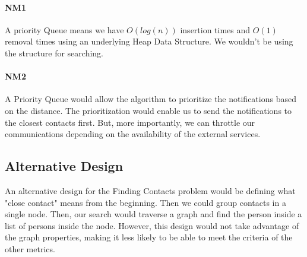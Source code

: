 \documentclass{article}
\begin{document}
\paragraph{NM1}

A priority Queue means we have $O(log(n))$ insertion times and $O(1)$ removal times using an underlying Heap Data Structure. We wouldn't be using the structure for searching.

\paragraph{NM2}

A Priority Queue would allow the algorithm to prioritize the notifications based on the distance. The prioritization would enable us to send the notifications to the closest contacts first. But, more importantly, we can throttle our communications depending on the availability of the external services.

\subsection{Alternative Design}

An alternative design for the Finding Contacts problem would be defining what "close contact" means from the beginning. Then we could group contacts in a single node. Then, our search would traverse a graph and find the person inside a list of persons inside the node. However, this design would not take advantage of the graph properties, making it less likely to be able to meet the criteria of the other metrics.
\end{document}
